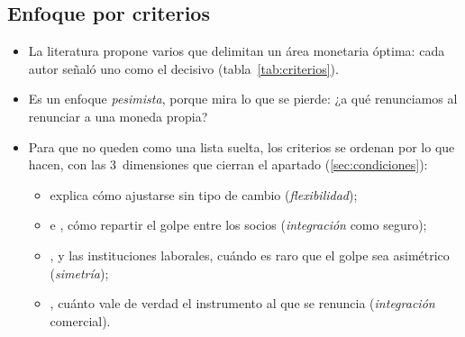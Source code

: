 \documentclass[11pt]{article}
\begin{document}
\subsection{Enfoque por criterios}\label{sec:criterios}

\begin{itemize}
\item La literatura propone varios  que delimitan un área monetaria óptima: cada autor señaló uno como el decisivo (tabla~\ref{tab:criterios}).
\item Es un enfoque \emph{pesimista}, porque mira lo que se pierde: ¿a qué renunciamos al renunciar a una moneda propia?
\item Para que no queden como una lista suelta, los criterios se ordenan por lo que hacen, con las 3~dimensiones que cierran el apartado (\ref{sec:condiciones}):
  \begin{itemize}
  \item {} explica cómo ajustarse sin tipo de cambio (\emph{flexibilidad});
  \item {} e , cómo repartir el golpe entre los socios (\emph{integración} como seguro);
  \item {},  y las instituciones laborales, cuándo es raro que el golpe sea asimétrico (\emph{simetría});
  \item {}, cuánto vale de verdad el instrumento al que se renuncia (\emph{integración} comercial).
  \end{itemize}
\end{itemize}
\end{document}
